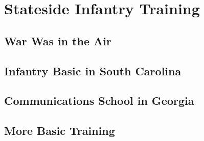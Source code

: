 



\frontmatter
% 



\renewcommand{\cftpartaftersnumb}{\hspace{.5em}}
\renewcommand{\cftchaptername}{\hspace{1em}}
\renewcommand\cftchapteraftersnumb{\normalfont}
\renewcommand\cftbeforechapterskip{5pt plus 1pt}
\tableofcontents

\mainmatter
\graphicspath{{\subfix{./images/}}}

\part{Stateside Infantry Training}\label{stateside-infantry-training}
\chapter{War Was in the Air}\label{war-in-the-air}


\chapter{Infantry Basic in South Carolina}\label{infantry-basic}


\chapter{Communications School in Georgia}\label{communications-school}


\chapter{More Basic Training}\label{more-basic-training}



